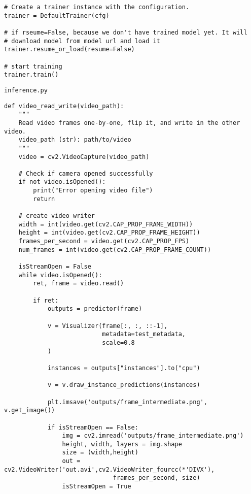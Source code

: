 \begin{verbatim}
# Create a trainer instance with the configuration.
trainer = DefaultTrainer(cfg) 

# if rseume=False, because we don't have trained model yet. It will
# download model from model url and load it
trainer.resume_or_load(resume=False)

# start training
trainer.train()
\end{verbatim}

\clearpage
\begin{verbatim}
inference.py
\end{verbatim}

\begin{verbatim}
def video_read_write(video_path):
    """
    Read video frames one-by-one, flip it, and write in the other video.
    video_path (str): path/to/video
    """
    video = cv2.VideoCapture(video_path)
    
    # Check if camera opened successfully
    if not video.isOpened(): 
        print("Error opening video file")
        return
    
    # create video writer
    width = int(video.get(cv2.CAP_PROP_FRAME_WIDTH))
    height = int(video.get(cv2.CAP_PROP_FRAME_HEIGHT))
    frames_per_second = video.get(cv2.CAP_PROP_FPS)
    num_frames = int(video.get(cv2.CAP_PROP_FRAME_COUNT))
    
    isStreamOpen = False
    while video.isOpened():
        ret, frame = video.read()
        
        if ret:
            outputs = predictor(frame)

            v = Visualizer(frame[:, :, ::-1],
                           metadata=test_metadata, 
                           scale=0.8
            )

            instances = outputs["instances"].to("cpu")

            v = v.draw_instance_predictions(instances)

            plt.imsave('outputs/frame_intermediate.png', v.get_image())

            if isStreamOpen == False:
                img = cv2.imread('outputs/frame_intermediate.png')
                height, width, layers = img.shape
                size = (width,height)
                out = cv2.VideoWriter('out.avi',cv2.VideoWriter_fourcc(*'DIVX'),
                		      frames_per_second, size)
                isStreamOpen = True


\end{verbatim}
